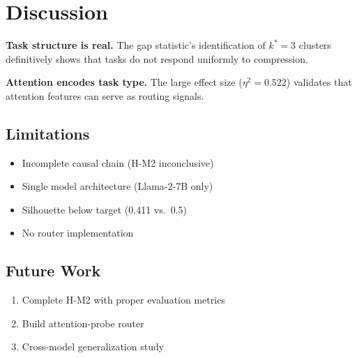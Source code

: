 \section{Discussion}

\textbf{Task structure is real.} The gap statistic's identification of $k^* = 3$ clusters definitively shows that tasks do not respond uniformly to compression.

\textbf{Attention encodes task type.} The large effect size ($\eta^2 = 0.522$) validates that attention features can serve as routing signals.

\subsection{Limitations}

\begin{itemize}
    \item Incomplete causal chain (H-M2 inconclusive)
    \item Single model architecture (Llama-2-7B only)
    \item Silhouette below target (0.411 vs.\ 0.5)
    \item No router implementation
\end{itemize}

\subsection{Future Work}

\begin{enumerate}
    \item Complete H-M2 with proper evaluation metrics
    \item Build attention-probe router
    \item Cross-model generalization study
\end{enumerate}
